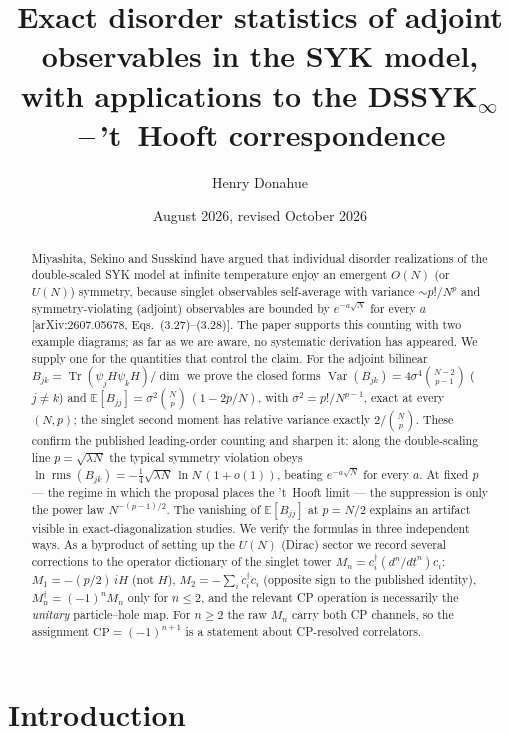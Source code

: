 \documentclass[11pt]{article}
\title{Exact disorder statistics of adjoint observables in the SYK model,\\
with applications to the DSSYK$_\infty$\,--\,'t~Hooft correspondence}
\author{Henry Donahue}
\date{August 2026, revised October 2026}
\newcommand{\Tr}{\operatorname{Tr}}
\newcommand{\Var}{\operatorname{Var}}
\newcommand{\rms}{\operatorname{rms}}
\begin{document}
\maketitle

\begin{abstract}
Miyashita, Sekino and Susskind have argued that individual disorder realizations
of the double-scaled SYK model at infinite temperature enjoy an emergent
$O(N)$ (or $U(N)$) symmetry, because singlet observables self-average with
variance $\sim p!/N^p$ and symmetry-violating (adjoint) observables are bounded
by $e^{-a\sqrt N}$ for every $a$ [arXiv:2607.05678, Eqs.~(3.27)--(3.28)].
The paper supports this counting with two example diagrams; as far as we
are aware, no systematic derivation has appeared. We supply one for the
quantities that control the claim. For the adjoint bilinear
$B_{jk}=\Tr(\psi_j H\psi_k H)/\dim$ we prove the closed forms
$\Var(B_{jk})=4\sigma^4\binom{N-2}{p-1}$ ($j\neq k$) and
$\mathbb E[B_{jj}]=\sigma^2\binom{N}{p}\,(1-2p/N)$, with
$\sigma^2=p!/N^{p-1}$, exact at every $(N,p)$; the singlet second moment has
relative variance exactly $2/\binom{N}{p}$. These confirm the published
leading-order counting and sharpen it: along the double-scaling line
$p=\sqrt{\lambda N}$ the typical symmetry violation obeys
$\ln\rms(B_{jk})=-\tfrac14\sqrt{\lambda N}\,\ln N\,(1+o(1))$, beating
$e^{-a\sqrt N}$ for every $a$. At fixed $p$ --- the regime in which the
proposal places the 't~Hooft limit --- the suppression is only the
power law $N^{-(p-1)/2}$. The vanishing of $\mathbb E[B_{jj}]$ at $p=N/2$
explains an artifact visible in exact-diagonalization studies. We verify the
formulas in three independent ways. As a byproduct of setting up the $U(N)$
(Dirac) sector we record several corrections to the operator dictionary of the
singlet tower $M_n=c_i^\dagger(d^n\!/dt^n)c_i$: $M_1=-(p/2)\,iH$ (not
$H$), $M_2=-\sum_i\dot c_i^\dagger\dot c_i$ (opposite sign to the published
identity), $M_n^\dagger=(-1)^nM_n$ only for $n\le2$, and the relevant CP
operation is necessarily the \emph{unitary} particle--hole map. For $n\ge2$
the raw $M_n$ carry both CP channels, so the assignment
$\mathrm{CP}=(-1)^{n+1}$ is a statement about CP-resolved correlators.
\end{abstract}

\section{Introduction}
\end{document}

